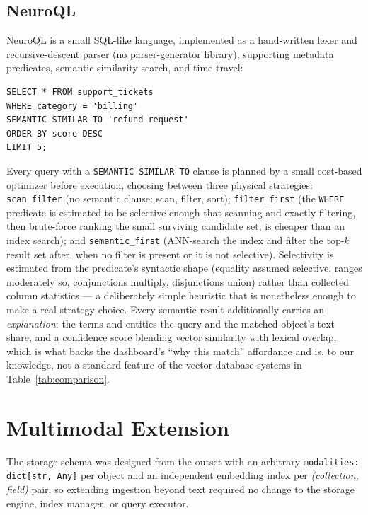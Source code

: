 \documentclass[conference]{IEEEtran}
\begin{document}
\subsection{NeuroQL}
\label{sec:neuroql}

NeuroQL is a small SQL-like language, implemented as a hand-written lexer and
recursive-descent parser (no parser-generator library), supporting metadata predicates,
semantic similarity search, and time travel:

\begin{lstlisting}[language=NeuroQL, caption={A hybrid NeuroQL query: a metadata filter narrows the candidate set before semantic ranking.}, label=lst:neuroql]
SELECT * FROM support_tickets
WHERE category = 'billing'
SEMANTIC SIMILAR TO 'refund request'
ORDER BY score DESC
LIMIT 5;
\end{lstlisting}

Every query with a \texttt{SEMANTIC SIMILAR TO} clause is planned by a small cost-based
optimizer before execution, choosing between three physical strategies: \texttt{scan\_filter}
(no semantic clause: scan, filter, sort); \texttt{filter\_first} (the \texttt{WHERE}
predicate is estimated to be selective enough that scanning and exactly filtering, then
brute-force ranking the small surviving candidate set, is cheaper than an index search); and
\texttt{semantic\_first} (ANN-search the index and filter the top-$k$ result set after,
when no filter is present or it is not selective). Selectivity is estimated from the
predicate's syntactic shape (equality assumed selective, ranges moderately so, conjunctions
multiply, disjunctions union) rather than collected column statistics --- a deliberately
simple heuristic that is nonetheless enough to make a real strategy choice. Every semantic
result additionally carries an \emph{explanation}: the terms and entities the query and the
matched object's text share, and a confidence score blending vector similarity with lexical
overlap, which is what backs the dashboard's ``why this match'' affordance and is, to our
knowledge, not a standard feature of the vector database systems in Table~\ref{tab:comparison}.

\section{Multimodal Extension}
\label{sec:multimodal}

The storage schema was designed from the outset with an arbitrary
\texttt{modalities: dict[str, Any]} per object and an independent embedding index per
\emph{(collection, field)} pair, so extending ingestion beyond text required no change to
the storage engine, index manager, or query executor.
\end{document}
